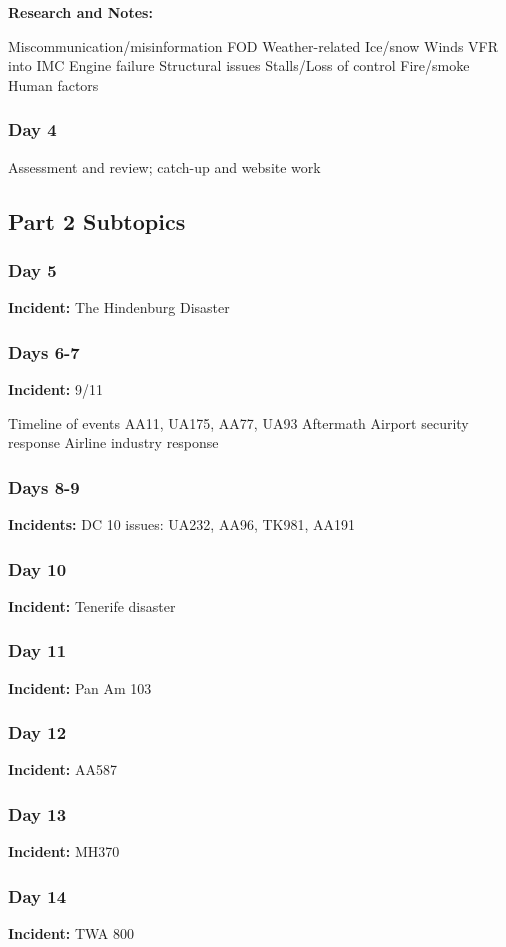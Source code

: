 \documentclass[12pt]{article}
\begin{document}
\textbf{Research and Notes:}
\begin{outline}
    \1 Miscommunication/misinformation
\1 FOD
\1 Weather-related
\2 Ice/snow
\2 Winds
\2 VFR into IMC
\1 Engine failure
\1 Structural issues
\1 Stalls/Loss of control
\1 Fire/smoke
\1 Human factors
\end{outline}
\subsubsection{Day 4}
Assessment and review; catch-up and website work
\subsection{Part 2 Subtopics}
\subsubsection{Day 5}
\textbf{Incident:} The Hindenburg Disaster
\subsubsection{Days 6-7}
\textbf{Incident:} 9/11
\begin{outline}
    \1 Timeline of events
\1 AA11, UA175, AA77, UA93
\1 Aftermath
\1 Airport security response
\1 Airline industry response
\end{outline}
\subsubsection{Days 8-9}
\textbf{Incidents:} DC 10 issues: UA232, AA96, TK981, AA191
\subsubsection{Day 10}
\textbf{Incident:} Tenerife disaster
\subsubsection{Day 11}
\textbf{Incident:} Pan Am 103
\subsubsection{Day 12}
\textbf{Incident:} AA587
\subsubsection{Day 13}
\textbf{Incident:} MH370
\subsubsection{Day 14}
\textbf{Incident:} TWA 800
\end{document}
